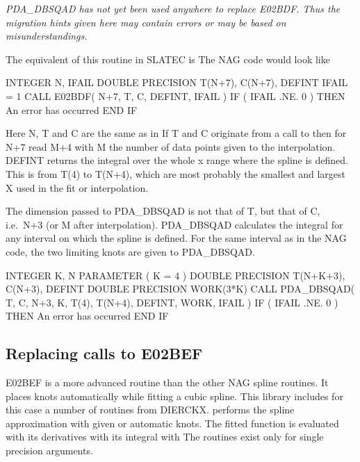 \documentclass[11pt,twoside,nolof]{starlink}
\begin{document}
\emph{PDA\_DBSQAD has not yet been used anywhere to replace E02BDF. Thus the
   migration hints given here may contain errors or may be based on
   misunderstandings.
\/}

   The equivalent of this routine in SLATEC is
   The NAG code
   would look like

\begin{terminalv}
      INTEGER N, IFAIL
      DOUBLE PRECISION T(N+7), C(N+7), DEFINT
      IFAIL = 1
      CALL E02BDF( N+7, T, C, DEFINT, IFAIL )
      IF ( IFAIL .NE. 0 ) THEN
         An error has occurred
      END IF
\end{terminalv}

   Here N, T and C are the same as in
   If T and C originate from
   a call to
   then for N+7 read M+4 with M the number of data
   points given to the interpolation. DEFINT returns the integral over
   the whole x range where the spline is defined. This is from T(4) to
   T(N+4), which are most probably the smallest and largest X used in
   the fit or interpolation.

   The dimension passed
   to PDA\_DBSQAD is not that of T, but that of C, i.e.\ N+3 (or M after
   interpolation). PDA\_DBSQAD calculates the integral for any interval
   on which the spline is defined. For the same interval as in the NAG
   code, the two limiting knots are given to PDA\_DBSQAD.

\begin{terminalv}
      INTEGER K, N
      PARAMETER ( K = 4 )
      DOUBLE PRECISION T(N+K+3), C(N+3), DEFINT
      DOUBLE PRECISION WORK(3*K)
      CALL PDA_DBSQAD( T, C, N+3, K, T(4), T(N+4), DEFINT, WORK, IFAIL )
      IF ( IFAIL .NE. 0 ) THEN
         An error has occurred
      END IF
\end{terminalv}


\subsection{Replacing calls to E02BEF}

   E02BEF is a more advanced routine than the other NAG spline routines.
   It places knots automatically while fitting a cubic spline. This
   library includes for this case a number of routines from DIERCKX.
   performs the spline approximation with given or
   automatic knots. The fitted function is evaluated with
   its
   derivatives with
   its integral with
   The routines exist
   only for single precision arguments.
\end{document}
